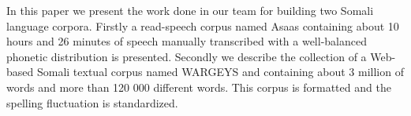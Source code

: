 In this paper we present the work done in our team for building two Somali language corpora. Firstly a read-speech corpus named Asaas containing about 10 hours and 26 minutes of speech manually transcribed with a well-balanced phonetic distribution is presented. Secondly we describe the collection of a Web-based Somali textual corpus named WARGEYS and containing about 3 million of words and more than 120 000 different words. This corpus is formatted and the spelling fluctuation is standardized.
